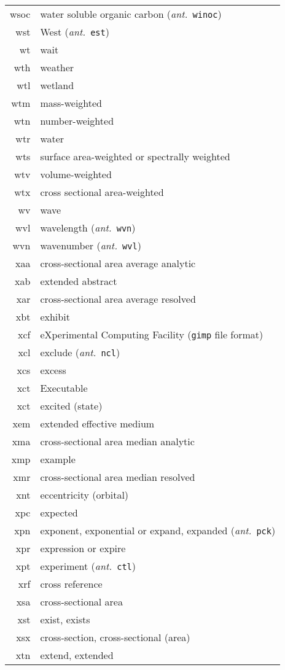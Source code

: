 \documentclass[12pt,twoside]{article}
\newcommand{\ant}[1]{(\textit{ant.}~\texttt{#1})}
\begin{document}
\begin{longtable}[>{\bfseries}l]{>{\ttfamily}r l}
wsoc & water soluble organic carbon \ant{winoc} \\
wst & West \ant{est} \\
wt & wait \\
wth & weather \\
wtl & wetland \\
wtm & mass-weighted \\
wtn & number-weighted \\
wtr & water \\
wts & surface area-weighted or spectrally weighted \\
wtv & volume-weighted \\
wtx & cross sectional area-weighted \\
wv & wave \\
wvl & wavelength \ant{wvn} \\
wvn & wavenumber \ant{wvl} \\
xaa & cross-sectional area average analytic \\
xab & extended abstract \\
xar & cross-sectional area average resolved \\
xbt & exhibit \\
xcf & eXperimental Computing Facility (\texttt{gimp} file format) \\
xcl & exclude \ant{ncl} \\
xcs & excess \\
xct & Executable \\
xct & excited (state) \\
xem & extended effective medium \\
xma & cross-sectional area median analytic \\
xmp & example \\
xmr & cross-sectional area median resolved \\
xnt & eccentricity (orbital)\\
xpc & expected \\
xpn & exponent, exponential or expand, expanded \ant{pck} \\
xpr & expression or expire \\
xpt & experiment \ant{ctl} \\
xrf & cross reference \\
xsa & cross-sectional area \\
xst & exist, exists \\
xsx & cross-section, cross-sectional (area) \\
xtn & extend, extended \\

\end{longtable}
\end{document}
